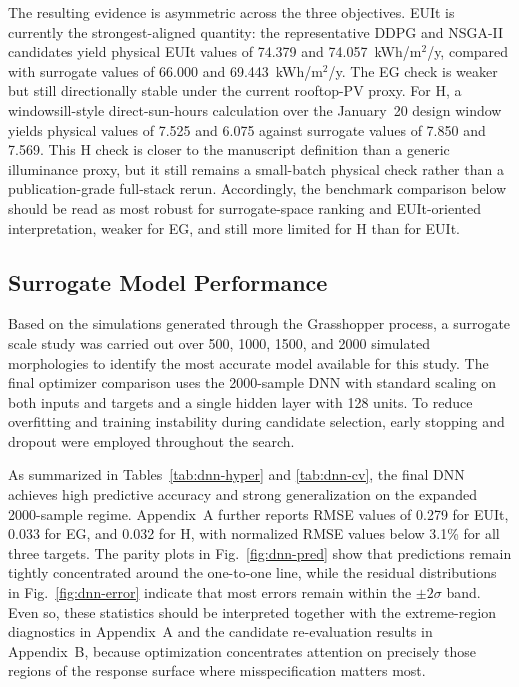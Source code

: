 \documentclass[final,3p,times]{elsarticle}
\begin{document}
The resulting evidence is asymmetric across the three objectives. EUIt is currently the strongest-aligned quantity: the representative DDPG and NSGA-II candidates yield physical EUIt values of 74.379 and 74.057~kWh/m$^2$/y, compared with surrogate values of 66.000 and 69.443~kWh/m$^2$/y. The EG check is weaker but still directionally stable under the current rooftop-PV proxy. For H, a windowsill-style direct-sun-hours calculation over the January~20 design window yields physical values of 7.525 and 6.075 against surrogate values of 7.850 and 7.569. This H check is closer to the manuscript definition than a generic illuminance proxy, but it still remains a small-batch physical check rather than a publication-grade full-stack rerun. Accordingly, the benchmark comparison below should be read as most robust for surrogate-space ranking and EUIt-oriented interpretation, weaker for EG, and still more limited for H than for EUIt.

\subsection{Surrogate Model Performance}

Based on the simulations generated through the Grasshopper process, a surrogate scale study was carried out over 500, 1000, 1500, and 2000 simulated morphologies to identify the most accurate model available for this study. The final optimizer comparison uses the 2000-sample DNN with standard scaling on both inputs and targets and a single hidden layer with 128 units. To reduce overfitting and training instability during candidate selection, early stopping and dropout were employed throughout the search.

As summarized in Tables~\ref{tab:dnn-hyper} and \ref{tab:dnn-cv}, the final DNN achieves high predictive accuracy and strong generalization on the expanded 2000-sample regime. Appendix~A further reports RMSE values of 0.279 for EUIt, 0.033 for EG, and 0.032 for H, with normalized RMSE values below 3.1\% for all three targets. The parity plots in Fig.~\ref{fig:dnn-pred} show that predictions remain tightly concentrated around the one-to-one line, while the residual distributions in Fig.~\ref{fig:dnn-error} indicate that most errors remain within the $\pm2\sigma$ band. Even so, these statistics should be interpreted together with the extreme-region diagnostics in Appendix~A and the candidate re-evaluation results in Appendix~B, because optimization concentrates attention on precisely those regions of the response surface where misspecification matters most.
\end{document}
